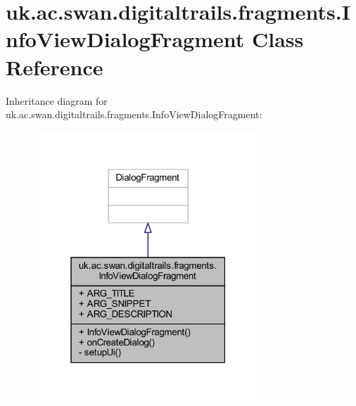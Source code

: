 \hypertarget{classuk_1_1ac_1_1swan_1_1digitaltrails_1_1fragments_1_1_info_view_dialog_fragment}{\section{uk.\+ac.\+swan.\+digitaltrails.\+fragments.\+Info\+View\+Dialog\+Fragment Class Reference}
\label{classuk_1_1ac_1_1swan_1_1digitaltrails_1_1fragments_1_1_info_view_dialog_fragment}
}


Inheritance diagram for uk.\+ac.\+swan.\+digitaltrails.\+fragments.\+Info\+View\+Dialog\+Fragment\+:
\nopagebreak
\begin{figure}[H]
\begin{center}
\leavevmode
\includegraphics[width=244pt]{classuk_1_1ac_1_1swan_1_1digitaltrails_1_1fragments_1_1_info_view_dialog_fragment__inherit__graph}
\end{center}
\end{figure}


